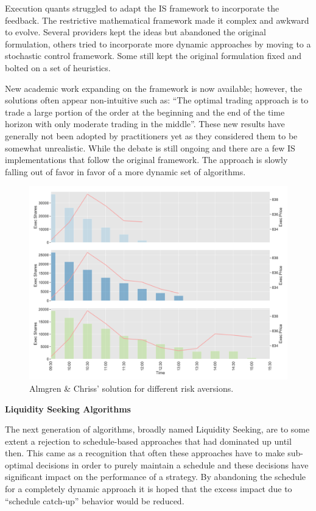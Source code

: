 Execution quants struggled to adapt the IS framework to incorporate the feedback. The restrictive mathematical framework made it complex and awkward to evolve. Several providers kept the ideas but abandoned the original formulation, others tried to incorporate more dynamic approaches by moving to a stochastic control framework. Some still kept the original formulation fixed and bolted on a set of heuristics.


New academic work expanding on the framework is now available; however, the solutions often appear non-intuitive such as: ``The optimal trading approach is to trade a large portion of the order at the beginning and the end of the time horizon with only moderate trading in the middle''. These new results have generally not been adopted by practitioners yet as they considered them to be somewhat unrealistic. While the debate is still ongoing and there are a few IS implementations that follow the original framework. The approach is slowly falling out of favor in favor of a more dynamic set of algorithms. \twomedskip

	\begin{figure}[!ht]
	\centering
	\includegraphics[width=\textwidth]{chapters/chapter_exec_models/figures/is.png} 
	\caption{Almgren \& Chriss' solution for different risk aversions. \label{fig:is}}
	\end{figure}



\noindent\textbf{Liquidity Seeking Algorithms} \twomedskip


The next generation of algorithms, broadly named Liquidity Seeking, are to some extent a rejection to schedule-based approaches that had dominated up until then. This came as a recognition that often these approaches have to make sub-optimal decisions in order to purely maintain a schedule and these decisions have significant impact on the performance of a strategy. By abandoning the schedule for a completely dynamic approach it is hoped that the excess impact due to ``schedule catch-up'' behavior would be reduced.


